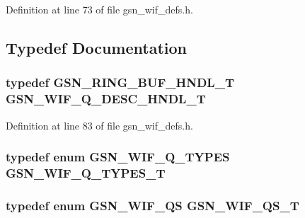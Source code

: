 Definition at line 73 of file gsn\_\-wif\_\-defs.h.



\subsection{Typedef Documentation}
\hypertarget{a00610_a1e30dabd05f45e796a3062085160d2a2}{
\subsubsection[{GSN\_\-WIF\_\-Q\_\-DESC\_\-HNDL\_\-T}]{\setlength{\rightskip}{0pt plus 5cm}typedef {\bf GSN\_\-RING\_\-BUF\_\-HNDL\_\-T} {\bf GSN\_\-WIF\_\-Q\_\-DESC\_\-HNDL\_\-T}}}
\label{a00610_a1e30dabd05f45e796a3062085160d2a2}


Definition at line 83 of file gsn\_\-wif\_\-defs.h.

\hypertarget{a00610_a70356467b56b9a88e2cf3d803b52d44d}{
\subsubsection[{GSN\_\-WIF\_\-Q\_\-TYPES\_\-T}]{\setlength{\rightskip}{0pt plus 5cm}typedef enum {\bf GSN\_\-WIF\_\-Q\_\-TYPES}  {\bf GSN\_\-WIF\_\-Q\_\-TYPES\_\-T}}}
\label{a00610_a70356467b56b9a88e2cf3d803b52d44d}
\hypertarget{a00610_a9d0e09456a07b17acc24bc23a4cd6318}{
\subsubsection[{GSN\_\-WIF\_\-QS\_\-T}]{\setlength{\rightskip}{0pt plus 5cm}typedef enum {\bf GSN\_\-WIF\_\-QS}  {\bf GSN\_\-WIF\_\-QS\_\-T}}}
\label{a00610_a9d0e09456a07b17acc24bc23a4cd6318}


